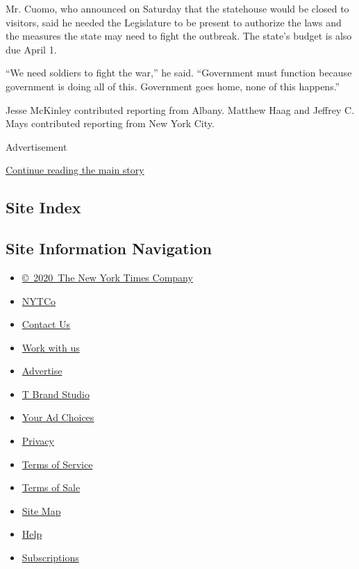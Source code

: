 Mr. Cuomo, who announced on Saturday that the statehouse would be closed
to visitors, said he needed the Legislature to be present to authorize
the laws and the measures the state may need to fight the outbreak. The
state's budget is also due April 1.

``We need soldiers to fight the war,'' he said. ``Government must
function because government is doing all of this. Government goes home,
none of this happens.''

Jesse McKinley contributed reporting from Albany. Matthew Haag and
Jeffrey C. Mays contributed reporting from New York City.

Advertisement

\protect\hyperlink{after-bottom}{Continue reading the main story}

\hypertarget{site-index}{%
\subsection{Site Index}\label{site-index}}

\hypertarget{site-information-navigation}{%
\subsection{Site Information
Navigation}\label{site-information-navigation}}

\begin{itemize}
\tightlist
\item
  \href{https://help.nytimes.com/hc/en-us/articles/115014792127-Copyright-notice}{©~2020~The
  New York Times Company}
\end{itemize}

\begin{itemize}
\tightlist
\item
  \href{https://www.nytco.com/}{NYTCo}
\item
  \href{https://help.nytimes.com/hc/en-us/articles/115015385887-Contact-Us}{Contact
  Us}
\item
  \href{https://www.nytco.com/careers/}{Work with us}
\item
  \href{https://nytmediakit.com/}{Advertise}
\item
  \href{http://www.tbrandstudio.com/}{T Brand Studio}
\item
  \href{https://www.nytimes.com/privacy/cookie-policy\#how-do-i-manage-trackers}{Your
  Ad Choices}
\item
  \href{https://www.nytimes.com/privacy}{Privacy}
\item
  \href{https://help.nytimes.com/hc/en-us/articles/115014893428-Terms-of-service}{Terms
  of Service}
\item
  \href{https://help.nytimes.com/hc/en-us/articles/115014893968-Terms-of-sale}{Terms
  of Sale}
\item
  \href{https://spiderbites.nytimes.com}{Site Map}
\item
  \href{https://help.nytimes.com/hc/en-us}{Help}
\item
  \href{https://www.nytimes.com/subscription?campaignId=37WXW}{Subscriptions}
\end{itemize}
